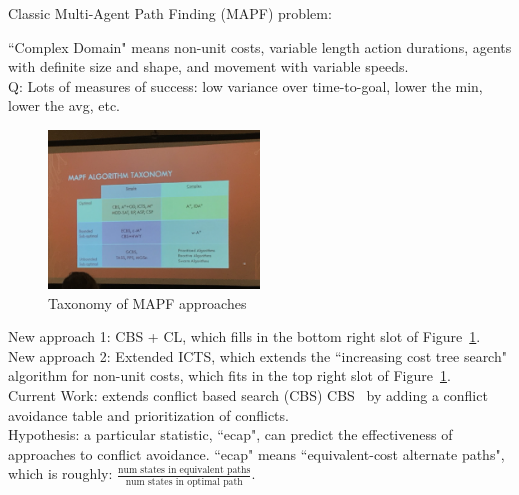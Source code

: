Classic Multi-Agent Path Finding (MAPF) problem: 


``Complex Domain" means non-unit costs, variable length action durations, agents with definite size and shape, and movement with variable speeds. \\

Q: Lots of measures of success: low variance over time-to-goal, lower the min, lower the avg, etc. \\

\begin{figure}[h!]
    \centering
    \includegraphics[width=0.5\textwidth]{images/mapf.JPG}
    \caption{Taxonomy of MAPF approaches}
    \label{fig:mapf}
\end{figure}

New approach 1: CBS + CL, which fills in the bottom right slot of Figure~\ref{fig:mapf}. \\

New approach 2: Extended ICTS, which extends the ``increasing cost tree search" algorithm for non-unit costs, which fits in the top right slot of Figure~\ref{fig:mapf}. \\

Current Work: extends conflict based search (CBS) CBS~\cite{sharon2012meta} by adding a conflict avoidance table and prioritization of conflicts. \\

Hypothesis: a particular statistic, ``ecap", can predict the effectiveness of approaches to conflict avoidance. ``ecap" means ``equivalent-cost alternate paths", which is roughly: $\frac{\text{num states in equivalent paths}}{\text{num states in optimal path}}$. \\

